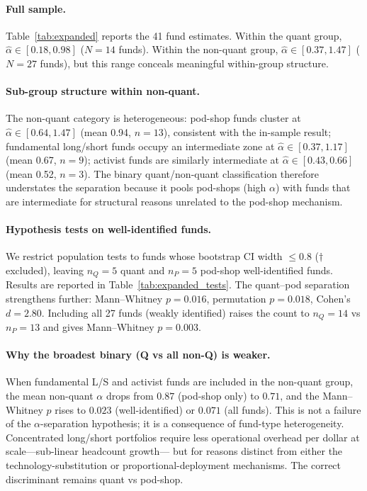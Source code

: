 \documentclass[10pt,onecolumn]{article}
\newcommand{\alphahat}{\hat{\alpha}}
\begin{document}
\paragraph{Full sample.}
Table~\ref{tab:expanded} reports the 41 fund estimates.
Within the quant group, $\alphahat \in [0.18, 0.98]$
($N{=}14$ funds).
Within the non-quant group, $\alphahat \in [0.37, 1.47]$
($N{=}27$ funds), but this range conceals meaningful
within-group structure.

\paragraph{Sub-group structure within non-quant.}
The non-quant category is heterogeneous:
pod-shop funds cluster at $\alphahat \in [0.64, 1.47]$
(mean 0.94, $n{=}13$), consistent with the in-sample result;
fundamental long/short funds occupy an intermediate zone
at $\alphahat \in [0.37, 1.17]$ (mean 0.67, $n{=}9$);
activist funds are similarly intermediate at
$\alphahat \in [0.43, 0.66]$ (mean 0.52, $n{=}3$).
The binary quant/non-quant classification therefore understates
the separation because it pools pod-shops (high $\alpha$) with
funds that are intermediate for structural reasons unrelated to
the pod-shop mechanism.

\paragraph{Hypothesis tests on well-identified funds.}
We restrict population tests to funds whose bootstrap CI width
$\leq 0.8$ ($\dagger$ excluded), leaving $n_Q{=}5$ quant and
$n_P{=}5$ pod-shop well-identified funds.
Results are reported in Table~\ref{tab:expanded_tests}.
The quant--pod separation strengthens further:
Mann--Whitney $p = 0.016$, permutation $p = 0.018$,
Cohen's $d = 2.80$.
Including all 27 funds (weakly identified) raises the count
to $n_Q{=}14$ vs $n_P{=}13$ and gives
Mann--Whitney $p = 0.003$.

\paragraph{Why the broadest binary (Q vs all non-Q) is weaker.}
When fundamental L/S and activist funds are included in the
non-quant group, the mean non-quant $\alpha$ drops from $0.87$
(pod-shop only) to $0.71$, and the Mann--Whitney $p$ rises to
$0.023$ (well-identified) or $0.071$ (all funds).
This is not a failure of the $\alpha$-separation hypothesis;
it is a consequence of fund-type heterogeneity.
Concentrated long/short portfolios require less operational
overhead per dollar at scale---sub-linear headcount growth---
but for reasons distinct from either the technology-substitution
or proportional-deployment mechanisms.
The correct discriminant remains quant vs pod-shop.
\end{document}

